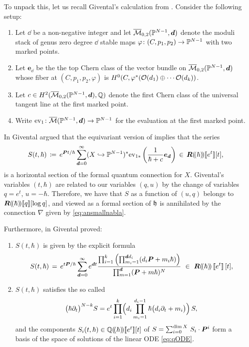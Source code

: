 \documentclass[twoside,leqno]{article}
\numberwithin{equation}{section}
\theoremstyle{plain}
\theoremstyle{definition}
\begin{document}
To unpack this, let us recall Givental's calculation from \cite[Section~9]{Givental_Equivariant_Gromov-Witten_invariants}.  Consider the following setup:
\begin{enumerate}[wide]
    \item Let $\dd$ be a non-negative integer and let
$\overline{\mathcal{M}}_{0,2}(\mathbb P^{N-1},\boldsymbol{d})$ denote the moduli stack of genus zero degree $\dd$ stable maps 
$\varphi \colon (C,p_{1},p_{2}) \to \mathbb P^{N-1}$ with two marked points.  
\item Let $\boldsymbol{e}_{\dd}$ be the the top Chern class of the vector bundle on $\overline{\mathcal{M}}_{0,2}(\mathbb P^{N-1},\boldsymbol{d})$ whose fiber at $(C,p_{1},p_{2},\varphi)$ is $H^0(C,\varphi^{*}(\mathcal O(d_{1})\oplus \cdots \mathcal O(d_{k}))$.  
\item 
Let $c \in H^2(\overline{\mathcal{M}}_{0,2}(\mathbb P^{N-1},\boldsymbol{d}),\mathbb Q)$ denote the first Chern class of the universal tangent line at the first marked point.
\item Write $\mathrm{ev}_{1} \colon \overline{\mathcal{M}}(\mathbb P^{N-1},\boldsymbol{d}) \to \mathbb P^{N-1}$ for the evaluation at the first marked point. 
\end{enumerate}
In \cite[Section~9]{Givental_Equivariant_Gromov-Witten_invariants} Givental argued that the equivariant version of \cite[Corollary~6.4]{Givental_Equivariant_Gromov-Witten_invariants} implies that the series 
\[
S(t,\hbar) \, \coloneqq \, e^{\boldsymbol{P} t/\hbar} \sum_{\boldsymbol{d} = 0}^{\infty} (X\hookrightarrow \mathbb P^{N-1})^{*} \mathrm{ev}_{1*}\left(\frac{1}{\hbar +c} \boldsymbol{e}_{\boldsymbol{d}}\right) \, \in \, \boldsymbol{R}(\!(\hbar)\!)[\![e^t]\!][t],
\]
is a horizontal section of the formal quantum connection for $X$.
Givental's variables $(t,\hbar)$ are related to our variables $(q,u)$ by the change of variables $q = e^{t}$, $u = -\hbar$. Therefore, we have that $S$ as a function of $(u,q)$ belongs to  
$\boldsymbol{R}(\!(\hbar)\!)[\![q]\!][\log q]$, and  viewed as a formal section of $\mathfrak{h}$ is annihilated by the connection $\nabla$ given by \eqref{eq:ansmallnabla}.

\medskip


Furthermore, in \cite[Theorem~9.1 and Corollary~9.2]{Givental_Equivariant_Gromov-Witten_invariants}
Givental proved:
\begin{enumerate}[wide]
    \item[(i)] $S(t,\hbar)$ is given by the explicit formula
\[
S(t,\hbar)  \, = \, e^{t\hpl/\hbar}\sum_{{\dd}=0}^\infty e^{\dd t} \frac{\prod_{i=1}^k \left(\prod_{m_i=1}^{\dd d_i}(d_i \hpl+m_i\hbar)\right)}{\prod_{m=1}^{\dd} (\hpl+m\hbar)^N} \ \in  \ \imageH(\!(\hbar)\!)\,\dbb{e^t}\,[t],
\]
\item[(ii)] $S(t,\hbar)$ satisfies the so called   
\begin{equation} \label{eq:qODE}
\bigl(\hbar \partial_t\bigr)^{N-k} S= e^t \prod_{i=1}^k\Bigl(d_i\prod_{m_i=1}^{d_i-1} \hbar\bigl(d_i\partial_t+m_i\bigr) \Bigr)\,S,
\end{equation}
and the components $S_{i}(t,\hbar) \in \mathbb Q(\!(\hbar)\!)[\![e^t]\!][t]$ of $S = \sum_{i=0}^{\dim X} \, S_{i}\cdot \boldsymbol{P}^{i}$ form a basis of the space of solutions of the linear ODE \eqref{eq:qODE}.
\end{enumerate}
\end{document}

